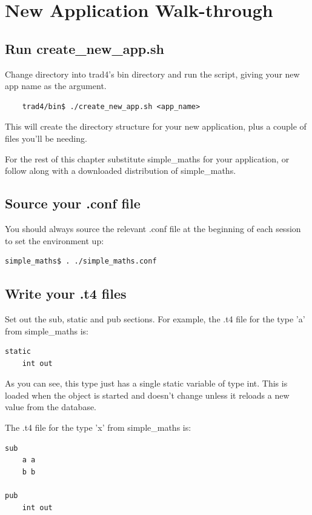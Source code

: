 \documentclass{report}
\begin{document}
\chapter{New Application Walk-through}

\section{Run create_new_app.sh}

Change directory into trad4's bin directory and run the script, giving your new app name as the argument.

\begin{verbatim}
    trad4/bin$ ./create_new_app.sh <app_name>
\end{verbatim}

This will create the directory structure for your new application, plus a couple of files you'll be needing.

For the rest of this chapter substitute simple_maths for your application, or follow along with a downloaded  distribution of simple_maths.

\section{Source your .conf file}

You should always source the relevant .conf file at the beginning of each session to set the environment  up:

\begin{verbatim}
simple_maths$ . ./simple_maths.conf
\end{verbatim}

\section{Write your .t4 files}

Set out the sub, static and pub sections. For example, the .t4 file for the type 'a' from simple_maths is:

\begin{verbatim}
static
    int out
\end{verbatim}

As you can see, this type just has a single static variable of type int. This is loaded when the object is started and doesn't change unless it reloads a new value from the database.

The .t4 file for the type 'x' from simple_maths is:

\begin{verbatim}
sub
    a a
    b b

pub 
    int out
\end{verbatim}
\end{document}
